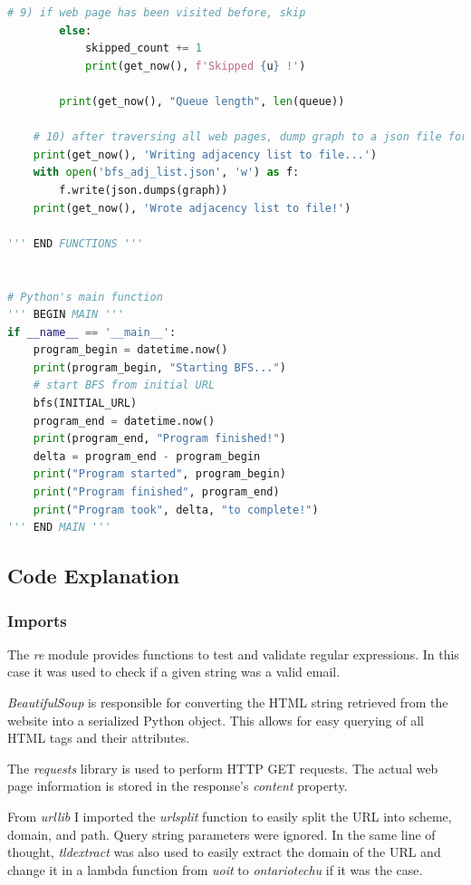 \begin{lstlisting}[language=Python]
        # 9) if web page has been visited before, skip
        else:
            skipped_count += 1
            print(get_now(), f'Skipped {u} !')
        
        print(get_now(), "Queue length", len(queue))

    # 10) after traversing all web pages, dump graph to a json file for posterior processing and analysis
    print(get_now(), 'Writing adjacency list to file...')
    with open('bfs_adj_list.json', 'w') as f:
        f.write(json.dumps(graph))
    print(get_now(), 'Wrote adjacency list to file!')

''' END FUNCTIONS '''


# Python's main function
''' BEGIN MAIN '''
if __name__ == '__main__':
    program_begin = datetime.now()
    print(program_begin, "Starting BFS...")
    # start BFS from initial URL
    bfs(INITIAL_URL)
    program_end = datetime.now()
    print(program_end, "Program finished!")
    delta = program_end - program_begin
    print("Program started", program_begin)
    print("Program finished", program_end)
    print("Program took", delta, "to complete!")
''' END MAIN '''
\end{lstlisting}

\subsection{Code Explanation}
\subsubsection{Imports}
The \textit{re} module provides functions to test and validate regular expressions. In this case it was used to check if a given string was a valid email.

\textit{BeautifulSoup} is responsible for converting the HTML string retrieved from the website into a serialized Python object. This allows for easy querying of all HTML tags and their attributes.

The \textit{requests} library is used to perform HTTP GET requests. The actual web page information is stored in the response's \textit{content} property.

From \textit{urllib} I imported the \textit{urlsplit} function to easily split the URL into scheme, domain, and path. Query string parameters were ignored. In the same line of thought, \textit{tldextract} was also used to easily extract the domain of the URL and change it in a lambda function from \textit{uoit} to \textit{ontariotechu} if it was the case.

